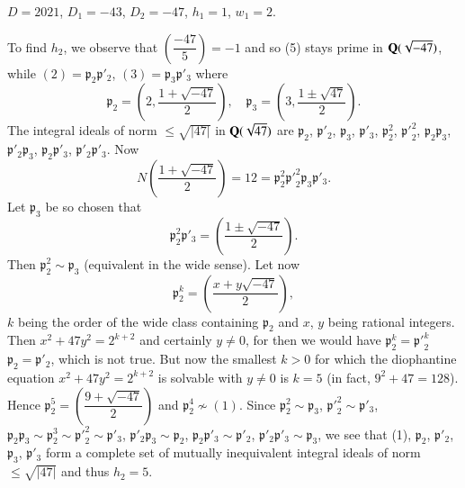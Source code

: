 \begin{exam}\label{exam6}
$D=2021$, $D_{1}=-43$, $D_{2}=-47$, $h_{1}=1$, $w_{1}=2$.
\end{exam}

To find $h_{2}$, we observe that $\left(\dfrac{-47}{5}\right)=-1$ and
so (5) stays prime in $\mathbf{Q}(\sqrt{-47})$, while
$(2)=\mathfrak{p}_{2}\mathfrak{p}'_{2}$,
$(3)=\mathfrak{p}_{3}\mathfrak{p}'_{3}$ where
$$
\mathfrak{p}_{2}=\left(2,\frac{1+\sqrt{-47}}{2}\right),\quad\mathfrak{p}_{3}=\left(3,\frac{1\pm
  \sqrt{47}}{2}\right). 
$$
The integral ideals of norm $\leq \sqrt{|47|}$ in $\mathbf{Q}(\sqrt{47})$ are
$\mathfrak{p}_{2}$, $\mathfrak{p}'_{2}$, $\mathfrak{p}_{3}$,
$\mathfrak{p}'_{3}$, $\mathfrak{p}^{2}_{2}$,
${\mathfrak{p}'}^{2}_{2}$, $\mathfrak{p}_{2}\mathfrak{p}_{3}$,
$\mathfrak{p}'_{2}\mathfrak{p}_{3}$,
$\mathfrak{p}_{2}\mathfrak{p}'_{3}$,
$\mathfrak{p}'_{2}\mathfrak{p}'_{3}$. Now 
$$
N\left(\frac{1+\sqrt{-47}}{2}\right)=12=\mathfrak{p}^{2}_{2}{\mathfrak{p}'}^{2}_{2}\mathfrak{p}_{3}\mathfrak{p}'_{3}.
$$\pageoriginale
Let $\mathfrak{p}_{3}$ be so chosen that
$$
\mathfrak{p}^{2}_{2}\mathfrak{p}'_{3}=\left(\frac{1\pm\sqrt{-47}}{2}\right).
$$
Then $\mathfrak{p}^{2}_{2}\sim \mathfrak{p}_{3}$ (equivalent in the
wide sense). Let now 
$$
\mathfrak{p}^{k}_{2}=\left(\frac{x+y\sqrt{-47}}{2}\right),
$$
$k$ being the order of the wide class containing $\mathfrak{p}_{2}$
and $x$, $y$ being rational integers. Then $x^{2}+47y^{2}=2^{k+2}$ and
certainly $y\neq 0$, for then we would have
$\mathfrak{p}^{k}_{2}={\mathfrak{p}'}^{k}_{2}$ \ie
$\mathfrak{p}_{2}=\mathfrak{p}'_{2}$, which is not true. But now the
smallest $k>0$ for which the diophantine equation
$x^{2}+47y^{2}=2^{k+2}$ is solvable with $y\neq 0$ is $k=5$ (in fact,
$9^{2}+47=128$). Hence
$\mathfrak{p}^{5}_{2}=\left(\dfrac{9+\sqrt{-47}}{2}\right)$ and
$\mathfrak{p}^{4}_{2}\not\sim (1)$. Since $\mathfrak{p}^{2}_{2}\sim
\mathfrak{p}_{3}$, ${\mathfrak{p}'}^{2}_{2}\sim\mathfrak{p}'_{3}$,
$\mathfrak{p}_{2}\mathfrak{p}_{3}\sim \mathfrak{p}^{3}_{2}\sim
         {\mathfrak{p}'}^{2}_{2}\sim \mathfrak{p}'_{3}$,
         $\mathfrak{p}'_{2}\mathfrak{p}_{3}\sim \mathfrak{p}_{2}$,
         $\mathfrak{p}_{2}\mathfrak{p}'_{3}\sim \mathfrak{p}'_{2}$,
         $\mathfrak{p}'_{2}\mathfrak{p}'_{3}\sim \mathfrak{p}_{3}$, we
         see that (1), $\mathfrak{p}_{2}$, $\mathfrak{p}'_{2}$,
         $\mathfrak{p}_{3}$, $\mathfrak{p}'_{3}$ form a complete set
         of mutually inequivalent integral ideals of norm $\leq
         \sqrt{|47|}$ and thus $h_{2}=5$.


